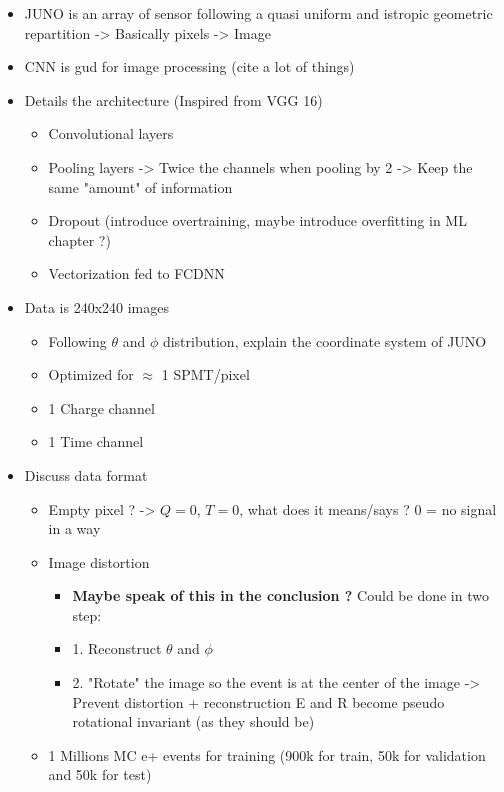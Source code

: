 \begin{itemize}
  \item JUNO is an array of sensor following a quasi uniform and istropic geometric repartition -> Basically pixels -> Image
  \item CNN is gud for image processing (cite a lot of things)
  \item Details the architecture (Inspired from VGG 16)
    \begin{itemize}
      \item Convolutional layers
      \item Pooling layers -> Twice the channels when pooling by 2 -> Keep the same "amount" of information
      \item Dropout (introduce overtraining, maybe introduce overfitting in ML chapter ?)
      \item Vectorization fed to FCDNN
    \end{itemize}
  \item Data is 240x240 images
    \begin{itemize}
      \item Following $\theta$ and $\phi$ distribution, explain the coordinate system of JUNO
      \item Optimized for $\approx$ 1 SPMT/pixel
      \item 1 Charge channel
      \item 1 Time channel
    \end{itemize}
  \item Discuss data format
    \begin{itemize}
      \item Empty pixel ? -> $Q = 0$, $T = 0$, what does it means/says ? 0 = no signal in a way
      \item Image distortion
        \begin{itemize}
          \item \textbf{Maybe speak of this in the conclusion ?} Could be done in two step:
          \item 1. Reconstruct $\theta$ and $\phi$
          \item 2. "Rotate" the image so the event is at the center of the image -> Prevent distortion + reconstruction E and R become pseudo rotational invariant (as they should be)
        \end{itemize}
      \item 1 Millions MC e+ events for training (900k for train, 50k for validation and 50k for test)
        \begin{itemize}

\end{itemize}
\end{itemize}
\end{itemize}
